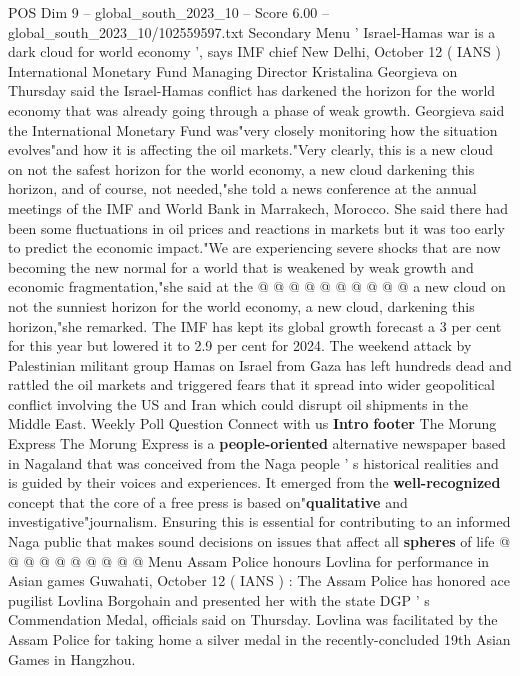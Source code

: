 \begin{textsample}{POS Dim 9 – global\_south\_2023\_10 – Score 6.00 – global\_south\_2023\_10/102559597.txt}  \label{ex:f9_pos_036}
Secondary Menu ' Israel-Hamas war is a dark cloud for world economy ', says IMF chief New Delhi, October 12 ( IANS ) International Monetary Fund Managing Director Kristalina Georgieva on Thursday said the Israel-Hamas conflict has darkened the horizon for the world economy that was already going through a phase of weak growth.
Georgieva said the International Monetary Fund was"very closely monitoring how the situation evolves"and how it is affecting the oil markets."Very clearly, this is a new cloud on not the safest horizon for the world economy, a new cloud darkening this horizon, and of course, not needed,"she told a news conference at the annual meetings of the IMF and World Bank in Marrakech, Morocco.
She said there had been some fluctuations in oil prices and reactions in markets but it was too early to predict the economic impact."We are experiencing severe shocks that are now becoming the new normal for a world that is weakened by weak growth and economic fragmentation,"she said at the @ @ @ @ @ @ @ @ @ @ a new cloud on not the sunniest horizon for the world economy, a new cloud, darkening this horizon,"she remarked.
The IMF has kept its global growth forecast a 3 per cent for this year but lowered it to 2.9 per cent for 2024.
The weekend attack by Palestinian militant group Hamas on Israel from Gaza has left hundreds dead and rattled the oil markets and triggered fears that it spread into wider geopolitical conflict involving the US and Iran which could disrupt oil shipments in the Middle East.
Weekly Poll Question Connect with us \textbf{Intro} \textbf{footer} The Morung Express The Morung Express is a \textbf{people-oriented} alternative newspaper based in Nagaland that was conceived from the Naga people ' s historical realities and is guided by their voices and experiences.
It emerged from the \textbf{well-recognized} concept that the core of a free press is based on"\textbf{qualitative} and investigative"journalism.
Ensuring this is essential for contributing to an informed Naga public that makes sound decisions on issues that affect all \textbf{spheres} of life @ @ @ @ @ @ @ @ @ @ Menu Assam Police honours Lovlina for performance in Asian games Guwahati, October 12 ( IANS ) : The Assam Police has honored ace pugilist Lovlina Borgohain and presented her with the state DGP ' s Commendation Medal, officials said on Thursday.
Lovlina was facilitated by the Assam Police for taking home a silver medal in the recently-concluded 19th Asian Games in Hangzhou.

\end{textsample}
